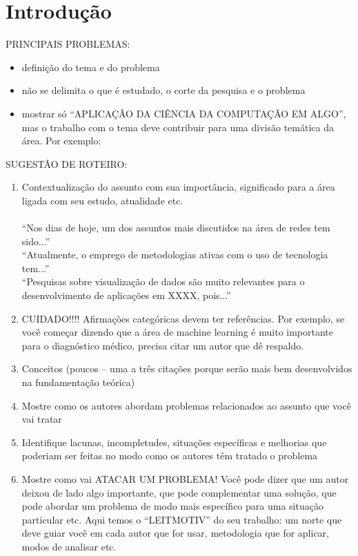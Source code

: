 \chapter[Introdução]{Introdução}
\label{cap:intro}

PRINCIPAIS PROBLEMAS:

\begin{itemize}
  \item definição do tema e do problema
  \item não se delimita o que é estudado, o corte da pesquisa e o problema
  \item mostrar só “APLICAÇÃO DA CIÊNCIA DA COMPUTAÇÃO EM ALGO”, mas o trabalho com o tema deve contribuir para uma divisão temática da área. Por exemplo:
\end{itemize}

SUGESTÃO DE ROTEIRO:
\begin{enumerate}
  \item Contextualização do assunto com sua importância, significado para a área ligada com seu estudo, atualidade etc.\\ \\ “Nos dias de hoje, um dos assuntos mais discutidos na área de redes tem sido...” \\ “Atualmente, o emprego de metodologias ativas com o uso de tecnologia tem...”\\ “Pesquisas sobre visualização de dados são muito relevantes para o desenvolvimento de aplicações em XXXX, pois...”\\
  \item CUIDADO!!!! Afirmações categóricas devem ter referências. Por exemplo, se você começar dizendo que a área de machine learning é muito importante para o diagnóstico médico, precisa citar um autor que dê respaldo.
  \item Conceitos (poucos – uma a três citações porque serão mais bem desenvolvidos na fundamentação teórica)
  \item Mostre como os autores abordam problemas relacionados ao assunto que você vai tratar
  \item Identifique lacunas, incompletudes, situações específicas e melhorias que poderiam ser feitas no modo como os autores têm tratado o problema
  \item Mostre como vai ATACAR UM PROBLEMA! Você pode dizer que um autor deixou de lado algo importante, que pode complementar uma solução, que pode abordar um problema de modo mais específico para uma situação particular etc. Aqui temos o “LEITMOTIV” do seu trabalho: um norte que deve guiar você em cada autor que for usar, metodologia que for aplicar, modos de analisar etc.
\end{enumerate}


